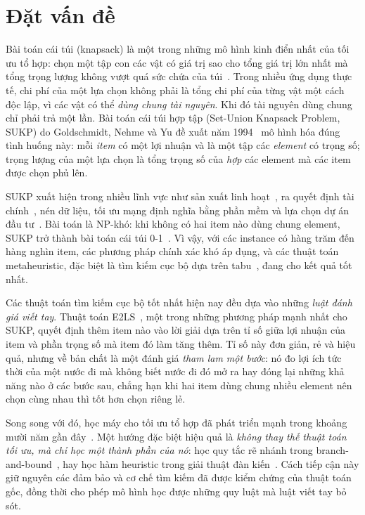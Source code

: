 \label{ch:chap1}

\section{Đặt vấn đề}

Bài toán cái túi (knapsack) là một trong những mô hình kinh điển nhất của tối ưu tổ hợp: chọn một tập con các vật có giá trị sao cho tổng giá trị lớn nhất mà tổng trọng lượng không vượt quá sức chứa của túi~\cite{Kellerer2004}. Trong nhiều ứng dụng thực tế, chi phí của một lựa chọn không phải là tổng chi phí của từng vật một cách độc lập, vì các vật có thể \emph{dùng chung tài nguyên}. Khi đó tài nguyên dùng chung chỉ phải trả một lần. Bài toán cái túi hợp tập (Set-Union Knapsack Problem, SUKP) do Goldschmidt, Nehme và Yu đề xuất năm 1994~\cite{Goldschmidt1994} mô hình hóa đúng tình huống này: mỗi \emph{item} có một lợi nhuận và là một tập các \emph{element} có trọng số; trọng lượng của một lựa chọn là tổng trọng số của \emph{hợp} các element mà các item được chọn phủ lên.

SUKP xuất hiện trong nhiều lĩnh vực như sản xuất linh hoạt~\cite{Goldschmidt1994}, ra quyết định tài chính~\cite{Khuller1999,Kellerer2004}, nén dữ liệu, tối ưu mạng định nghĩa bằng phần mềm và lựa chọn dự án đầu tư~\cite{Wei2019,Zhu2022}. Bài toán là NP-khó: khi không có hai item nào dùng chung element, SUKP trở thành bài toán cái túi 0-1~\cite{Goldschmidt1994,Arulselvan2014}. Vì vậy, với các instance có hàng trăm đến hàng nghìn item, các phương pháp chính xác khó áp dụng, và các thuật toán metaheuristic, đặc biệt là tìm kiếm cục bộ dựa trên tabu~\cite{Wei2019,Wei2021,Zhu2022}, đang cho kết quả tốt nhất.

Các thuật toán tìm kiếm cục bộ tốt nhất hiện nay đều dựa vào những \emph{luật đánh giá viết tay}. Thuật toán E2LS~\cite{Zhu2022}, một trong những phương pháp mạnh nhất cho SUKP, quyết định thêm item nào vào lời giải dựa trên tỉ số giữa lợi nhuận của item và phần trọng số mà item đó làm tăng thêm. Tỉ số này đơn giản, rẻ và hiệu quả, nhưng về bản chất là một đánh giá \emph{tham lam một bước}: nó đo lợi ích tức thời của một nước đi mà không biết nước đi đó mở ra hay đóng lại những khả năng nào ở các bước sau, chẳng hạn khi hai item dùng chung nhiều element nên chọn cùng nhau thì tốt hơn chọn riêng lẻ.

Song song với đó, học máy cho tối ưu tổ hợp đã phát triển mạnh trong khoảng mười năm gần đây~\cite{Bengio2021}. Một hướng đặc biệt hiệu quả là \emph{không thay thế thuật toán tối ưu, mà chỉ học một thành phần của nó}: học quy tắc rẽ nhánh trong branch-and-bound~\cite{Gasse2019}, hay học hàm heuristic trong giải thuật đàn kiến~\cite{Ye2023DeepACO}. Cách tiếp cận này giữ nguyên các đảm bảo và cơ chế tìm kiếm đã được kiểm chứng của thuật toán gốc, đồng thời cho phép mô hình học được những quy luật mà luật viết tay bỏ sót.

